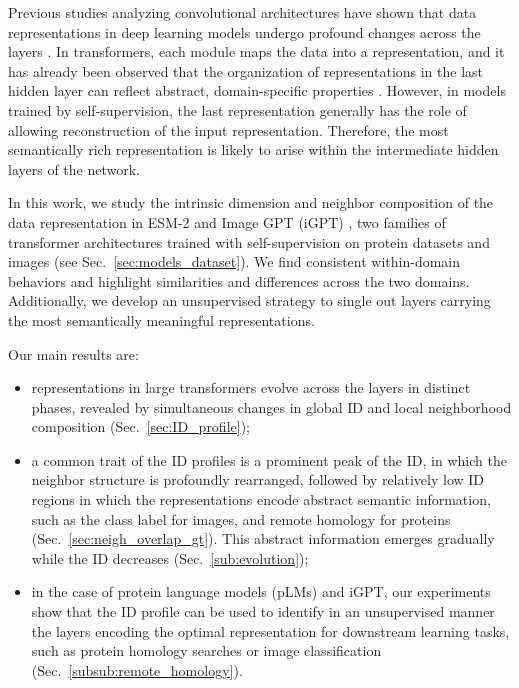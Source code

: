 \documentclass{article}
\begin{document}
Previous studies analyzing convolutional architectures have shown that data representations in deep learning models undergo profound changes across the layers \cite{ansuini2019intrinsic,doimo2020hierarchical}. In transformers, each module maps the data into a representation, and it has already been observed that the organization of representations in the last hidden layer can reflect abstract, domain-specific properties \cite{igpt}. 
%
However, in models trained by self-supervision, the last representation generally has the role of allowing reconstruction of the input representation. Therefore, the most semantically rich representation is likely to arise within the intermediate hidden layers of the network. 

In this work, we study the intrinsic dimension and neighbor composition of the data representation in ESM-2 \cite{esm2} and Image GPT (iGPT) \cite{igpt}, two families of transformer architectures trained with self-supervision on protein datasets and images (see Sec.~\ref{sec:models_dataset}).
%
We find consistent within-domain behaviors and highlight similarities and differences across the two domains. Additionally, we develop an unsupervised strategy to single out layers carrying the most semantically meaningful representations.

Our main results are:
\begin{itemize}
    \item representations in large transformers evolve across the layers in distinct phases, revealed by simultaneous changes in global ID  and local neighborhood composition (Sec.~\ref{sec:ID_profile});
    \item a common trait of the ID profiles is a prominent peak of the ID, in which the neighbor structure is profoundly rearranged, followed by relatively low ID regions in which the representations encode abstract semantic information, such as the class label for images, and remote homology for proteins (Sec.~\ref{sec:neigh_overlap_gt}). This abstract information emerges gradually while the ID decreases (Sec.~\ref{sub:evolution});
    \item in the case of protein language models (pLMs) and iGPT, our experiments show that the ID profile can be used to identify in an unsupervised manner the layers encoding the optimal representation for downstream learning tasks, such as protein homology searches or image classification (Sec.~\ref{subsub:remote_homology}). 
\end{itemize}
\end{document}
